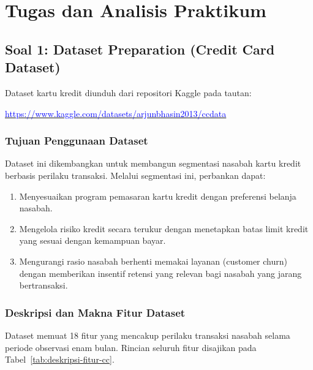 \documentclass[a4paper,oneside,12pt]{report}
\begin{document}
\section{Tugas dan Analisis Praktikum}

\subsection{Soal 1: Dataset Preparation (Credit Card Dataset)}
Dataset kartu kredit diunduh dari repositori Kaggle pada tautan:
\begin{center}
\href{https://www.kaggle.com/datasets/arjunbhasin2013/ccdata}{\textcolor{blue}{https://www.kaggle.com/datasets/arjunbhasin2013/ccdata}} \cite{kaggle-ccdata}
\end{center}

\subsubsection{Tujuan Penggunaan Dataset}
Dataset ini dikembangkan untuk membangun segmentasi nasabah kartu kredit berbasis perilaku transaksi. Melalui segmentasi ini, perbankan dapat:
\begin{enumerate}[noitemsep, topsep=2pt, parsep=1pt]
    \item Menyesuaikan program pemasaran kartu kredit dengan preferensi belanja nasabah.
    \item Mengelola risiko kredit secara terukur dengan menetapkan batas limit kredit yang sesuai dengan kemampuan bayar.
    \item Mengurangi rasio nasabah berhenti memakai layanan (customer churn) dengan memberikan insentif retensi yang relevan bagi nasabah yang jarang bertransaksi.
\end{enumerate}

\subsubsection{Deskripsi dan Makna Fitur Dataset}
Dataset memuat 18 fitur yang mencakup perilaku transaksi nasabah selama periode observasi enam bulan. Rincian seluruh fitur disajikan pada Tabel~\ref{tab:deskripsi-fitur-cc}.
\end{document}
